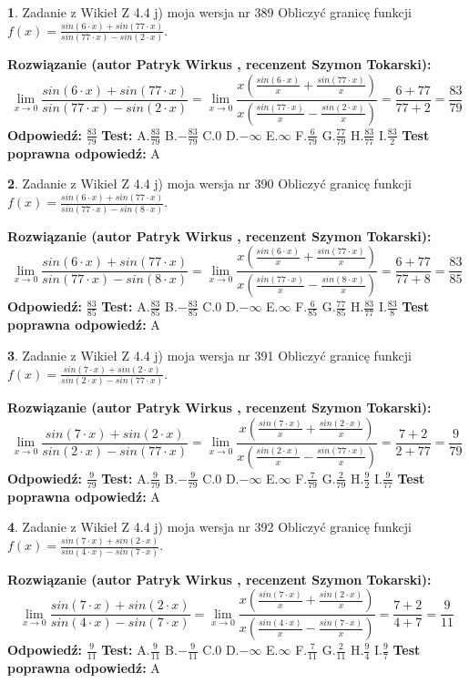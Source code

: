 \documentclass[12pt, a4paper]{article}
\theoremstyle{definition} %
\newtheorem{zad}{}
\newcommand{\zadStart}[1]{\begin{zad}#1\newline}
\newcommand{\zadStop}{\end{zad}}
\newcommand{\rozwStart}[2]{\noindent \textbf{Rozwiązanie (autor #1 , recenzent #2): }\newline}
\newcommand{\rozwStop}{\newline}
\newcommand{\odpStart}{\noindent \textbf{Odpowiedź:}\newline}
\newcommand{\odpStop}{\newline}
\newcommand{\testStart}{\noindent \textbf{Test:}\newline}
\newcommand{\testStop}{\newline}
\newcommand{\kluczStart}{\noindent \textbf{Test poprawna odpowiedź:}\newline}
\newcommand{\kluczStop}{\newline}
\begin{document}
\zadStart{Zadanie z Wikieł Z 4.4 j) moja wersja nr 389}
Obliczyć granicę funkcji $f(x)=\frac{sin(6\cdot x) +sin(77\cdot x)}{sin(77\cdot x) -sin(2\cdot x)}$.
\zadStop
\rozwStart{Patryk Wirkus}{Szymon Tokarski}
$$\lim\limits_{x\to 0}\frac{sin(6\cdot x) +sin(77\cdot x)}{sin(77\cdot x) -sin(2\cdot x)}=\lim\limits_{x\to 0}\frac{x(\frac{sin(6\cdot x)}{x}+\frac{sin(77\cdot x)}{x})}{x(\frac{sin(77\cdot x)}{x}-\frac{sin(2\cdot x)}{x})}=\frac{6+77}{77+2} = \frac{83}{79}$$
\rozwStop
\odpStart
$\frac{83}{79}$
\odpStop
\testStart
A.$\frac{83}{79}$
B.$-\frac{83}{79}$
C.$0$
D.$-\infty$
E.$\infty$
F.$\frac{6}{79}$
G.$\frac{77}{79}$
H.$\frac{83}{77}$
I.$\frac{83}{2}$
\testStop
\kluczStart
A
\kluczStop



\zadStart{Zadanie z Wikieł Z 4.4 j) moja wersja nr 390}
Obliczyć granicę funkcji $f(x)=\frac{sin(6\cdot x) +sin(77\cdot x)}{sin(77\cdot x) -sin(8\cdot x)}$.
\zadStop
\rozwStart{Patryk Wirkus}{Szymon Tokarski}
$$\lim\limits_{x\to 0}\frac{sin(6\cdot x) +sin(77\cdot x)}{sin(77\cdot x) -sin(8\cdot x)}=\lim\limits_{x\to 0}\frac{x(\frac{sin(6\cdot x)}{x}+\frac{sin(77\cdot x)}{x})}{x(\frac{sin(77\cdot x)}{x}-\frac{sin(8\cdot x)}{x})}=\frac{6+77}{77+8} = \frac{83}{85}$$
\rozwStop
\odpStart
$\frac{83}{85}$
\odpStop
\testStart
A.$\frac{83}{85}$
B.$-\frac{83}{85}$
C.$0$
D.$-\infty$
E.$\infty$
F.$\frac{6}{85}$
G.$\frac{77}{85}$
H.$\frac{83}{77}$
I.$\frac{83}{8}$
\testStop
\kluczStart
A
\kluczStop



\zadStart{Zadanie z Wikieł Z 4.4 j) moja wersja nr 391}
Obliczyć granicę funkcji $f(x)=\frac{sin(7\cdot x) +sin(2\cdot x)}{sin(2\cdot x) -sin(77\cdot x)}$.
\zadStop
\rozwStart{Patryk Wirkus}{Szymon Tokarski}
$$\lim\limits_{x\to 0}\frac{sin(7\cdot x) +sin(2\cdot x)}{sin(2\cdot x) -sin(77\cdot x)}=\lim\limits_{x\to 0}\frac{x(\frac{sin(7\cdot x)}{x}+\frac{sin(2\cdot x)}{x})}{x(\frac{sin(2\cdot x)}{x}-\frac{sin(77\cdot x)}{x})}=\frac{7+2}{2+77} = \frac{9}{79}$$
\rozwStop
\odpStart
$\frac{9}{79}$
\odpStop
\testStart
A.$\frac{9}{79}$
B.$-\frac{9}{79}$
C.$0$
D.$-\infty$
E.$\infty$
F.$\frac{7}{79}$
G.$\frac{2}{79}$
H.$\frac{9}{2}$
I.$\frac{9}{77}$
\testStop
\kluczStart
A
\kluczStop



\zadStart{Zadanie z Wikieł Z 4.4 j) moja wersja nr 392}
Obliczyć granicę funkcji $f(x)=\frac{sin(7\cdot x) +sin(2\cdot x)}{sin(4\cdot x) -sin(7\cdot x)}$.
\zadStop
\rozwStart{Patryk Wirkus}{Szymon Tokarski}
$$\lim\limits_{x\to 0}\frac{sin(7\cdot x) +sin(2\cdot x)}{sin(4\cdot x) -sin(7\cdot x)}=\lim\limits_{x\to 0}\frac{x(\frac{sin(7\cdot x)}{x}+\frac{sin(2\cdot x)}{x})}{x(\frac{sin(4\cdot x)}{x}-\frac{sin(7\cdot x)}{x})}=\frac{7+2}{4+7} = \frac{9}{11}$$
\rozwStop
\odpStart
$\frac{9}{11}$
\odpStop
\testStart
A.$\frac{9}{11}$
B.$-\frac{9}{11}$
C.$0$
D.$-\infty$
E.$\infty$
F.$\frac{7}{11}$
G.$\frac{2}{11}$
H.$\frac{9}{4}$
I.$\frac{9}{7}$
\testStop
\kluczStart
A
\kluczStop
\end{document}

